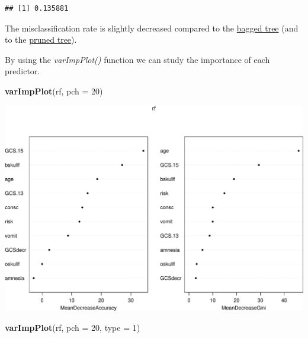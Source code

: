 \documentclass[ignorenonframetext,]{beamer}
\newenvironment{Shaded}{\begin{snugshade}}{\end{snugshade}}
\newcommand{\KeywordTok}[1]{\textcolor[rgb]{0.13,0.29,0.53}{\textbf{#1}}}
\newcommand{\DataTypeTok}[1]{\textcolor[rgb]{0.13,0.29,0.53}{#1}}
\newcommand{\DecValTok}[1]{\textcolor[rgb]{0.00,0.00,0.81}{#1}}
\newcommand{\NormalTok}[1]{#1}
\begin{document}
\begin{frame}[fragile]
\begin{verbatim}
## [1] 0.135881
\end{verbatim}

\normalsize

The misclassification rate is slightly decreased compared to the
\protect\hyperlink{bagex}{bagged tree} (and to the
\protect\hyperlink{expruning}{pruned tree}).

\end{frame}

\begin{frame}[fragile]

By using the \emph{varImpPlot()} function we can study the importance of
each predictor.

\begin{Shaded}
\begin{Highlighting}[]
\KeywordTok{varImpPlot}\NormalTok{(rf, }\DataTypeTok{pch =} \DecValTok{20}\NormalTok{)}
\end{Highlighting}
\end{Shaded}

\includegraphics{8TreesBEAMER_files/figure-beamer/unnamed-chunk-35-1.pdf}

\begin{Shaded}
\begin{Highlighting}[]
\KeywordTok{varImpPlot}\NormalTok{(rf, }\DataTypeTok{pch =} \DecValTok{20}\NormalTok{, }\DataTypeTok{type =} \DecValTok{1}\NormalTok{)}
\end{Highlighting}
\end{Shaded}


\end{frame}
\end{document}
